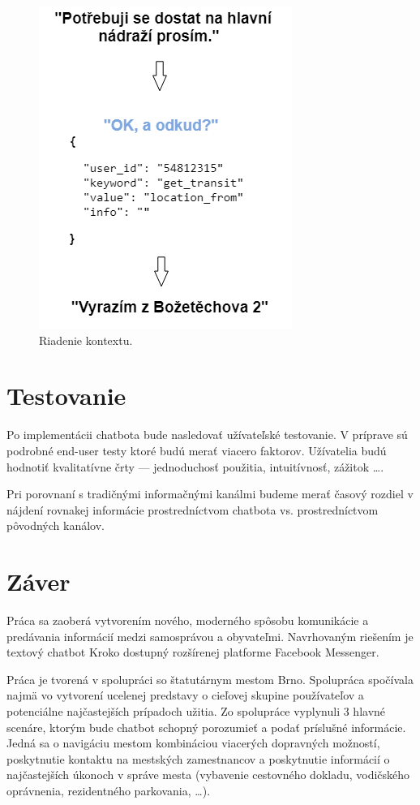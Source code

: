 \documentclass{ExcelAtFIT}
\begin{document}
\begin{figure}[h]
  \centering
  \includegraphics[width=0.7\linewidth]{context.png}
  \caption{Riadenie kontextu.}
  \label{kontext}
\end{figure}

\section{Testovanie}
Po implementácii chatbota bude nasledovať užívateľské testovanie. V príprave sú podrobné end-user testy ktoré budú merať viacero faktorov. Užívatelia budú hodnotiť kvalitatívne črty --- jednoduchosť použitia, intuitívnosť, zážitok \ldots.

Pri porovnaní s tradičnými informačnými kanálmi budeme merať časový rozdiel v nájdení rovnakej informácie prostredníctvom chatbota vs. prostredníctvom pôvodných kanálov.

\section{Záver}

Práca sa zaoberá vytvorením nového, moderného spôsobu komunikácie a predávania informácií medzi samosprávou a obyvateľmi. Navrhovaným riešením je textový chatbot Kroko dostupný rozšírenej platforme Facebook Messenger.

Práca je tvorená v spolupráci so štatutárnym mestom Brno. Spolupráca spočívala najmä vo vytvorení ucelenej predstavy o cieľovej skupine používateľov a potenciálne najčastejších prípadoch užitia.
Zo spolupráce vyplynuli 3 hlavné scenáre, ktorým bude chatbot schopný porozumieť a podať príslušné informácie. \\
Jedná sa o navigáciu mestom kombináciou viacerých dopravných možností, poskytnutie kontaktu na mestských zamestnancov a poskytnutie informácií o najčastejších úkonoch v správe mesta (vybavenie cestovného dokladu, vodičského oprávnenia, rezidentného parkovania, \dots).
\end{document}
